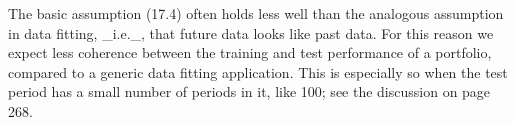 The basic assumption (17.4) often holds less well than the analogous assumption in data fitting, _i.e._, that future data looks like past data. For this reason we expect less coherence between the training and test performance of a portfolio, compared to a generic data fitting application. This is especially so when the test period has a small number of periods in it, like 100; see the discussion on page 268.

 